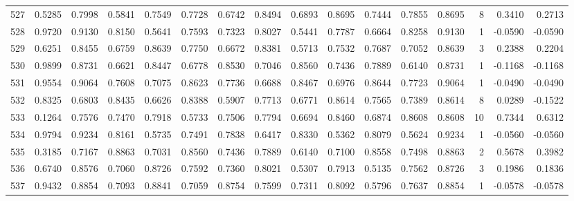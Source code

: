 \begin{tabular}{lrrrrrrrrrrrrrrr}
527 &      0.5285 &  0.7998 &  0.5841 &  0.7549 &  0.7728 &  0.6742 &  0.8494 &  0.6893 &  0.8695 &  0.7444 &   0.7855 &     0.8695 &      8 &                    0.3410 &                     0.2713 \\
528 &      0.9720 &  0.9130 &  0.8150 &  0.5641 &  0.7593 &  0.7323 &  0.8027 &  0.5441 &  0.7787 &  0.6664 &   0.8258 &     0.9130 &      1 &                   -0.0590 &                    -0.0590 \\
529 &      0.6251 &  0.8455 &  0.6759 &  0.8639 &  0.7750 &  0.6672 &  0.8381 &  0.5713 &  0.7532 &  0.7687 &   0.7052 &     0.8639 &      3 &                    0.2388 &                     0.2204 \\
530 &      0.9899 &  0.8731 &  0.6621 &  0.8447 &  0.6778 &  0.8530 &  0.7046 &  0.8560 &  0.7436 &  0.7889 &   0.6140 &     0.8731 &      1 &                   -0.1168 &                    -0.1168 \\
531 &      0.9554 &  0.9064 &  0.7608 &  0.7075 &  0.8623 &  0.7736 &  0.6688 &  0.8467 &  0.6976 &  0.8644 &   0.7723 &     0.9064 &      1 &                   -0.0490 &                    -0.0490 \\
532 &      0.8325 &  0.6803 &  0.8435 &  0.6626 &  0.8388 &  0.5907 &  0.7713 &  0.6771 &  0.8614 &  0.7565 &   0.7389 &     0.8614 &      8 &                    0.0289 &                    -0.1522 \\
533 &      0.1264 &  0.7576 &  0.7470 &  0.7918 &  0.5733 &  0.7506 &  0.7794 &  0.6694 &  0.8460 &  0.6874 &   0.8608 &     0.8608 &     10 &                    0.7344 &                     0.6312 \\
534 &      0.9794 &  0.9234 &  0.8161 &  0.5735 &  0.7491 &  0.7838 &  0.6417 &  0.8330 &  0.5362 &  0.8079 &   0.5624 &     0.9234 &      1 &                   -0.0560 &                    -0.0560 \\
535 &      0.3185 &  0.7167 &  0.8863 &  0.7031 &  0.8560 &  0.7436 &  0.7889 &  0.6140 &  0.7100 &  0.8558 &   0.7498 &     0.8863 &      2 &                    0.5678 &                     0.3982 \\
536 &      0.6740 &  0.8576 &  0.7060 &  0.8726 &  0.7592 &  0.7360 &  0.8021 &  0.5307 &  0.7913 &  0.5135 &   0.7562 &     0.8726 &      3 &                    0.1986 &                     0.1836 \\
537 &      0.9432 &  0.8854 &  0.7093 &  0.8841 &  0.7059 &  0.8754 &  0.7599 &  0.7311 &  0.8092 &  0.5796 &   0.7637 &     0.8854 &      1 &                   -0.0578 &                    -0.0578 \\

\end{tabular}
